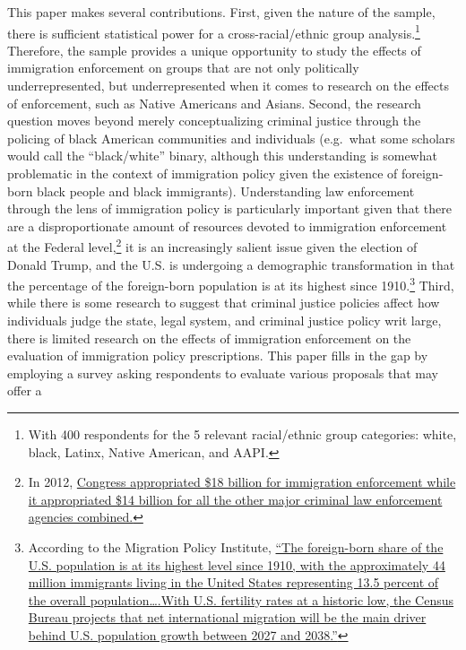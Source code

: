 \documentclass[10pt,]{article}
\begin{document}
This paper makes several contributions. First, given the nature of the
sample, there is sufficient statistical power for a cross-racial/ethnic
group analysis.\footnote{With 400 respondents for the 5 relevant
  racial/ethnic group categories: white, black, Latinx, Native American,
  and AAPI.} Therefore, the sample provides a unique opportunity to
study the effects of immigration enforcement on groups that are not only
politically underrepresented, but underrepresented when it comes to
research on the effects of enforcement, such as Native Americans and
Asians. Second, the research question moves beyond merely
conceptualizing criminal justice through the policing of black American
communities and individuals (e.g.~what some scholars would call the
``black/white'' binary, although this understanding is somewhat
problematic in the context of immigration policy given the existence of
foreign-born black people and black immigrants). Understanding law
enforcement through the lens of immigration policy is particularly
important given that there are a disproportionate amount of resources
devoted to immigration enforcement at the Federal level,\footnote{In
  2012,
  \href{https://www.theatlantic.com/magazine/archive/2018/09/trump-ice/565772/}{Congress
  appropriated \$18 billion for immigration enforcement while it
  appropriated \$14 billion for all the other major criminal law
  enforcement agencies combined.}} it is an increasingly salient issue
given the election of Donald Trump, and the U.S. is undergoing a
demographic transformation in that the percentage of the foreign-born
population is at its highest since 1910.\footnote{According to the
  Migration Policy Institute,
  \href{https://www.migrationpolicy.org/article/immigrants-us-states-fastest-growing-foreign-born-populations}{``The
  foreign-born share of the U.S. population is at its highest level
  since 1910, with the approximately 44 million immigrants living in the
  United States representing 13.5 percent of the overall
  population\ldots{}.With U.S. fertility rates at a historic low, the
  Census Bureau projects that net international migration will be the
  main driver behind U.S. population growth between 2027 and 2038.''}}
Third, while there is some research to suggest that criminal justice
policies affect how individuals judge the state, legal system, and
criminal justice policy writ large, there is limited research on the
effects of immigration enforcement on the evaluation of immigration
policy prescriptions. This paper fills in the gap by employing a survey
asking respondents to evaluate various proposals that may offer a
\end{document}
